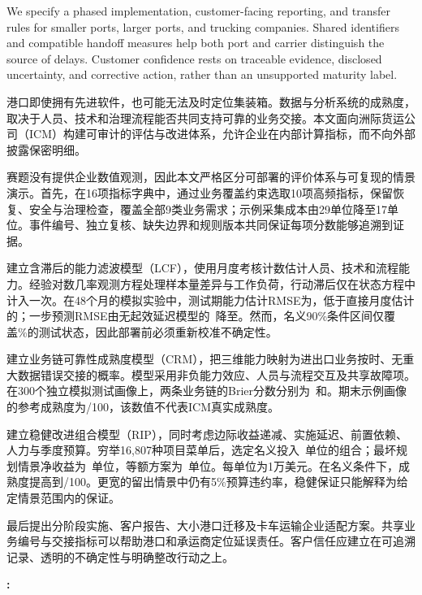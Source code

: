 {We specify a phased implementation, customer-facing reporting, and transfer rules for smaller ports, larger ports, and trucking companies. Shared identifiers and compatible handoff measures help both port and carrier distinguish the source of delays. Customer confidence rests on traceable evidence, disclosed uncertainty, and corrective action, rather than an unsupported maturity label.
}{
港口即使拥有先进软件，也可能无法及时定位集装箱。数据与分析系统的成熟度，取决于人员、技术和治理流程能否共同支持可靠的业务交接。本文面向洲际货运公司（ICM）构建可审计的评估与改进体系，允许企业在内部计算指标，而不向外部披露保密明细。

赛题没有提供企业数值观测，因此本文严格区分可部署的评价体系与可复现的情景演示。首先，在16项指标字典中，通过业务覆盖约束选取10项高频指标，保留恢复、安全与治理检查，覆盖全部9类业务需求；示例采集成本由29单位降至17单位。事件编号、独立复核、缺失边界和规则版本共同保证每项分数能够追溯到证据。

建立含滞后的能力滤波模型（LCF），使用月度考核计数估计人员、技术和流程能力。经验对数几率观测方程处理样本量差异与工作负荷，行动滞后仅在状态方程中计入一次。在48个月的模拟实验中，测试期能力估计RMSE为\StateRMSE，低于直接月度估计的\RawRMSE；一步预测RMSE由无起效延迟模型的\ZeroRMSE\ 降至\ForecastRMSE。然而，名义90\%条件区间仅覆盖\Coverage\%的测试状态，因此部署前必须重新校准不确定性。

建立业务链可靠性成熟度模型（CRM），把三维能力映射为进出口业务按时、无重大数据错误交接的概率。模型采用非负能力效应、人员与流程交互及共享故障项。在300个独立模拟测试画像上，两条业务链的Brier分数分别为\BrierImport\ 和\BrierExport。期末示例画像的参考成熟度为\BaseMaturity/100，该数值不代表ICM真实成熟度。

建立稳健改进组合模型（RIP），同时考虑边际收益递减、实施延迟、前置依赖、人力与季度预算。穷举16,807种项目菜单后，选定名义投入\PlanCost\ 单位的组合；最坏规划情景净收益为\WorstNet\ 单位，等额方案为\EqualNet\ 单位。每单位为1万美元。在名义条件下，成熟度提高到\FinalMaturity/100。更宽的留出情景中仍有5\%预算违约率，稳健保证只能解释为给定情景范围内的保证。

最后提出分阶段实施、客户报告、大小港口迁移及卡车运输企业适配方案。共享业务编号与交接指标可以帮助港口和承运商定位延误责任。客户信任应建立在可追溯记录、透明的不确定性与明确整改行动之上。
}
\par\smallskip\noindent\textbf{:} 

